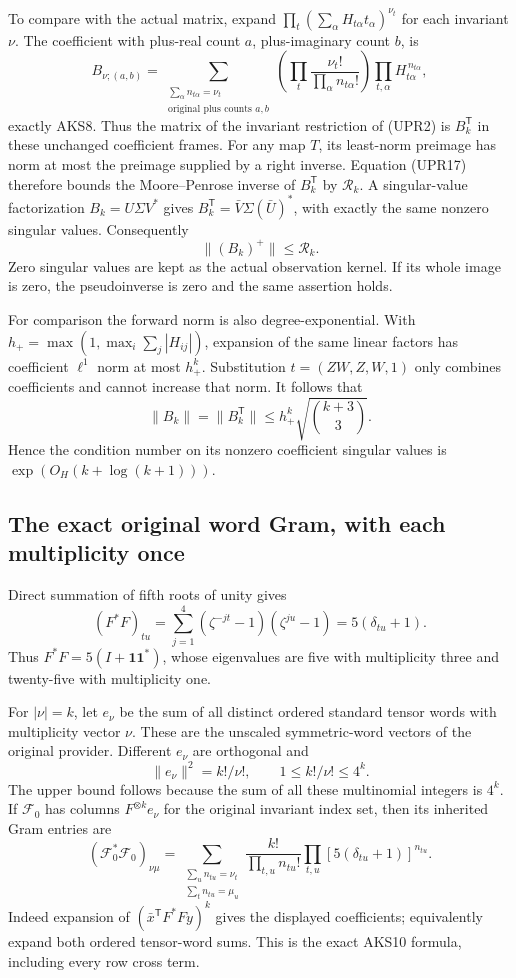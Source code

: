 \documentclass[11pt,a4paper]{article}
\begin{document}
To compare with the actual matrix, expand
\(\prod_t(\sum_\alpha H_{t\alpha}t_\alpha)^{\nu_t}\)
for each invariant \(\nu\).
The coefficient with plus-real count \(a\), plus-imaginary count
\(b\), is
\[
B_{\nu;(a,b)}
=\sum_{\substack{\sum_\alpha n_{t\alpha}=\nu_t\\
                  \text{original plus counts }a,b}}
\left(\prod_t\frac{\nu_t!}{\prod_\alpha n_{t\alpha}!}\right)
\prod_{t,\alpha}H_{t\alpha}^{\,n_{t\alpha}},
\tag{UPR18}
\]
exactly AKS8.  Thus the matrix of the invariant restriction of
(UPR2) is \(B_k^{\mathsf T}\) in these unchanged coefficient frames.
For any map \(T\), its least-norm preimage has norm at most the
preimage supplied by a right inverse.  Equation (UPR17) therefore
bounds the Moore--Penrose inverse of \(B_k^{\mathsf T}\) by
\(\mathscr R_k\).  A singular-value factorization
\(B_k=U\Sigma V^*\) gives
\(B_k^{\mathsf T}=\bar V\Sigma(\bar U)^*\), with exactly the
same nonzero singular values.  Consequently
\[
\|(B_k)^+\|\le\mathscr R_k.
\tag{UPR19}
\]
Zero singular values are kept as the actual observation kernel.
If its whole image is zero, the pseudoinverse is zero and the
same assertion holds.

For comparison the forward norm is also degree-exponential.
With \(h_+=\max(1,\max_i\sum_j|H_{ij}|)\), expansion of the same
linear factors has coefficient \(\ell^1\) norm at most \(h_+^k\).
Substitution \(t=(ZW,Z,W,1)\) only combines coefficients and cannot
increase that norm.  It follows that
\[
\|B_k\|=\|B_k^{\mathsf T}\|
\le h_+^k\sqrt{\binom{k+3}{3}}.
\tag{UPR20}
\]
Hence the condition number on its nonzero coefficient singular
values is \(\exp(O_H(k+\log(k+1)))\).

\subsection{The exact original word Gram, with each multiplicity once}
Direct summation of fifth roots of unity gives
\[
(F^*F)_{tu}
=\sum_{j=1}^4(\zeta^{-jt}-1)(\zeta^{ju}-1)
=5(\delta_{tu}+1).
\tag{UPR21}
\]
Thus \(F^*F=5(I+\mathbf1\mathbf1^*)\), whose eigenvalues are
five with multiplicity three and twenty-five with multiplicity one.

For \(|\nu|=k\), let \(e_\nu\) be the sum of all distinct ordered
standard tensor words with multiplicity vector \(\nu\).
These are the unscaled symmetric-word vectors of the original
provider.  Different \(e_\nu\) are orthogonal and
\[
\|e_\nu\|^2=k!/\nu!,\qquad
1\le k!/\nu!\le4^k.
\tag{UPR22}
\]
The upper bound follows because the sum of all these multinomial
integers is \(4^k\).
If \(\mathcal F_0\) has columns \(F^{\otimes k}e_\nu\) for the
original invariant index set, then its inherited Gram entries are
\[
(\mathcal F_0^*\mathcal F_0)_{\nu\mu}
=\sum_{\substack{\sum_u n_{tu}=\nu_t\\
                  \sum_t n_{tu}=\mu_u}}
\frac{k!}{\prod_{t,u}n_{tu}!}
\prod_{t,u}[5(\delta_{tu}+1)]^{n_{tu}}.
\tag{UPR23}
\]
Indeed expansion of
\((\bar x^{\mathsf T}F^*Fy)^k\) gives the displayed coefficients;
equivalently expand both ordered tensor-word sums.
This is the exact AKS10 formula, including every row cross term.
\end{document}
